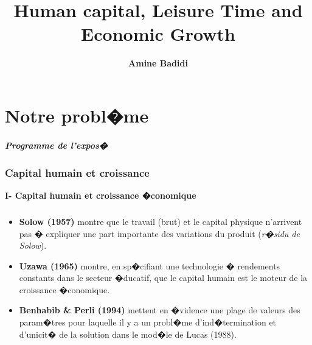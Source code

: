 \documentclass[10pt, hyperref={pdfpagemode=FullScreen}]{beamer} %
\title{Human capital, Leisure Time and Economic Growth}
\author{\textbf{Amine Badidi}}
\institute{
Campus de Fouillole, Guadeloupe\\
24-25 Avril 2008
}
\date{}
\begin{document}
\frame{\titlepage}


\part{Notre probl�me}  

\begin{frame}
\frametitle{Programme de l'expos�}
\tableofcontents
\end{frame}

\section{Capital humain et croissance}

\begin{frame}
\transdissolve
\begin{block}{}
\centering \huge{\textbf{I- Capital humain et croissance �conomique}}
\end{block}
\end{frame}

\begin{frame}
\transdissolve
\begin{block}{}
\end{block}
\end{frame}

\begin{frame}
\transwipe[direction=360]
     \frametitle{}
     \begin{block}{}
     \begin{itemize}
     \item<1-> \textbf{Solow (1957)} montre que le travail (brut) et le capital physique n'arrivent pas � expliquer         une part importante des variations du produit (\emph{r�sidu de Solow}). 
     \item<2-> \textbf{Uzawa (1965)} montre, en sp�cifiant une technologie � rendements constants dans le secteur          �ducatif, que le capital humain est le moteur de la croissance �conomique.
     \item<3-> \textbf{Benhabib \& Perli (1994)} mettent en �vidence une plage de valeurs des param�tres pour laquelle      il y a un probl�me d'ind�termination et d'unicit� de la solution dans le mod�le de Lucas (1988).
     \end{itemize}
      \end{block}
\end{frame}


\begin{frame}
\transdissolve
\begin{block}{}
\end{block}
\end{frame}
\end{document}
